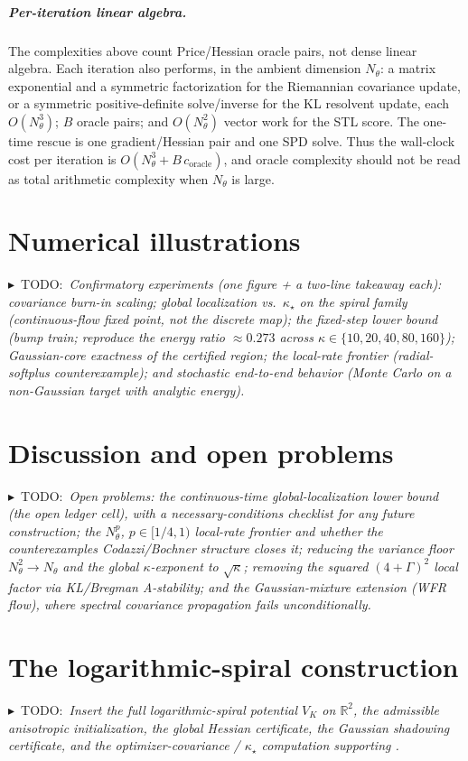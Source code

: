 \documentclass[11pt]{article}
\theoremstyle{plain}
\theoremstyle{definition}
\theoremstyle{remark}
\newcommand{\R}{\mathbb{R}}
\newcommand{\TODO}[1]{{\color{red}$\blacktriangleright$~\textsf{TODO:}~\textit{#1}}}
\newcommand{\kappastar}{\kappa_\star}
\begin{document}
\subparagraph{Per-iteration linear algebra.}
The complexities above count Price/Hessian oracle pairs, not dense linear algebra. Each iteration
also performs, in the ambient dimension $N_\theta$: a matrix exponential and a symmetric
factorization for the Riemannian covariance update, or a symmetric positive-definite solve/inverse
for the KL resolvent update, each $O(N_\theta^3)$; $B$ oracle pairs; and $O(N_\theta^2)$ vector work
for the STL score. The one-time rescue is one gradient/Hessian pair and one SPD solve. Thus the
wall-clock cost per iteration is $O(N_\theta^3+B\,c_{\mathrm{oracle}})$, and oracle complexity should
not be read as total arithmetic complexity when $N_\theta$ is large.

\section{Numerical illustrations}
\label{sec:numerics}
\TODO{Confirmatory experiments (one figure + a two-line takeaway each): covariance burn-in scaling;
global localization vs.\ $\kappastar$ on the spiral family (continuous-flow fixed point, not the
discrete map); the fixed-step lower bound (bump train; reproduce the energy ratio $\approx0.273$
across $\kappa\in\{10,20,40,80,160\}$); Gaussian-core exactness of the certified region; the local-rate
frontier (radial-softplus counterexample); and stochastic end-to-end behavior (Monte Carlo on a
non-Gaussian target with analytic energy).}

\section{Discussion and open problems}
\label{sec:discussion}
\TODO{Open problems: the continuous-time global-localization lower bound (the open ledger cell), with a
necessary-conditions checklist for any future construction; the $N_\theta^{p}$, $p\in[1/4,1)$ local-rate
frontier and whether the counterexamples Codazzi/Bochner structure closes it; reducing the variance
floor $N_\theta^2\to N_\theta$ and the global $\kappa$-exponent to $\sqrt\kappa$; removing the squared
$(4+\Gamma)^2$ local factor via KL/Bregman A-stability; and the Gaussian-mixture extension (WFR flow),
where spectral covariance propagation fails unconditionally.}

\appendix

\section{The logarithmic-spiral construction}
\label{app:spiral}
\TODO{Insert the full logarithmic-spiral potential $V_K$ on $\R^2$, the admissible anisotropic
initialization, the global Hessian certificate, the Gaussian shadowing certificate, and the
optimizer-covariance / $\kappastar$ computation supporting \Cref{thm:spiral-sharp,cor:cont-sharp}.}
\end{document}
